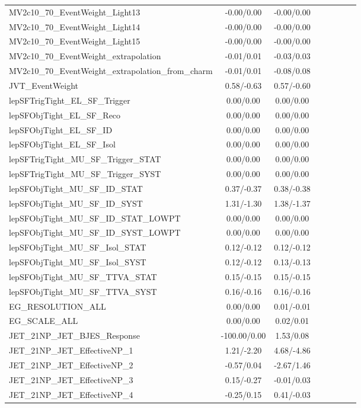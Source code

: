 \begin{table}[h]
\begin{center}
\begin{tabular}{l|ccccccc}
MV2c10\_70\_EventWeight\_Light13 &-0.00/0.00 &-0.00/0.00 \\
MV2c10\_70\_EventWeight\_Light14 &-0.00/0.00 &-0.00/0.00 \\
MV2c10\_70\_EventWeight\_Light15 &-0.00/0.00 &-0.00/0.00 \\
MV2c10\_70\_EventWeight\_extrapolation &-0.01/0.01 &-0.03/0.03 \\
MV2c10\_70\_EventWeight\_extrapolation\_from\_charm &-0.01/0.01 &-0.08/0.08 \\
JVT\_EventWeight &0.58/-0.63 &0.57/-0.60 \\
lepSFTrigTight\_EL\_SF\_Trigger &0.00/0.00 &0.00/0.00 \\
lepSFObjTight\_EL\_SF\_Reco &0.00/0.00 &0.00/0.00 \\
lepSFObjTight\_EL\_SF\_ID &0.00/0.00 &0.00/0.00 \\
lepSFObjTight\_EL\_SF\_Isol &0.00/0.00 &0.00/0.00 \\
lepSFTrigTight\_MU\_SF\_Trigger\_STAT &0.00/0.00 &0.00/0.00 \\
lepSFTrigTight\_MU\_SF\_Trigger\_SYST &0.00/0.00 &0.00/0.00 \\
lepSFObjTight\_MU\_SF\_ID\_STAT &0.37/-0.37 &0.38/-0.38 \\
lepSFObjTight\_MU\_SF\_ID\_SYST &1.31/-1.30 &1.38/-1.37 \\
lepSFObjTight\_MU\_SF\_ID\_STAT\_LOWPT &0.00/0.00 &0.00/0.00 \\
lepSFObjTight\_MU\_SF\_ID\_SYST\_LOWPT &0.00/0.00 &0.00/0.00 \\
lepSFObjTight\_MU\_SF\_Isol\_STAT &0.12/-0.12 &0.12/-0.12 \\
lepSFObjTight\_MU\_SF\_Isol\_SYST &0.12/-0.12 &0.13/-0.13 \\
lepSFObjTight\_MU\_SF\_TTVA\_STAT &0.15/-0.15 &0.15/-0.15 \\
lepSFObjTight\_MU\_SF\_TTVA\_SYST &0.16/-0.16 &0.16/-0.16 \\
EG\_RESOLUTION\_ALL &0.00/0.00 &0.01/-0.01 \\
EG\_SCALE\_ALL &0.00/0.00 &0.02/0.01 \\
JET\_21NP\_JET\_BJES\_Response &-100.00/0.00 &1.53/0.08 \\
JET\_21NP\_JET\_EffectiveNP\_1 &1.21/-2.20 &4.68/-4.86 \\
JET\_21NP\_JET\_EffectiveNP\_2 &-0.57/0.04 &-2.67/1.46 \\
JET\_21NP\_JET\_EffectiveNP\_3 &0.15/-0.27 &-0.01/0.03 \\
JET\_21NP\_JET\_EffectiveNP\_4 &-0.25/0.15 &0.41/-0.03 \\

\end{tabular}
\end{center}
\end{table}
